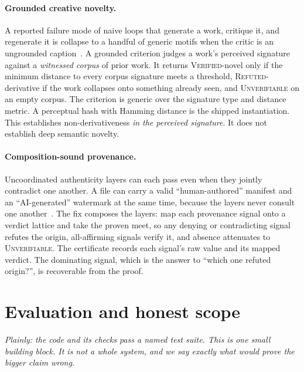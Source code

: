 \documentclass[11pt]{article}
\begin{document}
\paragraph{Grounded creative novelty.} A reported failure mode of naive loops that generate a work, critique it, and regenerate it is collapse to a handful of generic motifs when the critic is an ungrounded caption~\cite{patterns}. A grounded criterion judges a work's perceived signature against a \emph{witnessed corpus} of prior work. It returns \textsc{Verified}-novel only if the minimum distance to every corpus signature meets a threshold, \textsc{Refuted}-derivative if the work collapses onto something already seen, and \textsc{Unverifiable} on an empty corpus. The criterion is generic over the signature type and distance metric. A perceptual hash with Hamming distance is the shipped instantiation. This establishes non-derivativeness \emph{in the perceived signature}. It does not establish deep semantic novelty.

\paragraph{Composition-sound provenance.} Uncoordinated authenticity layers can each pass even when they jointly contradict one another. A file can carry a valid ``human-authored'' manifest and an ``AI-generated'' watermark at the same time, because the layers never consult one another~\cite{authcontra}. The fix composes the layers: map each provenance signal onto a verdict lattice and take the proven meet, so any denying or contradicting signal refutes the origin, all-affirming signals verify it, and absence attenuates to \textsc{Unverifiable}. The certificate records each signal's raw value and its mapped verdict. The dominating signal, which is the answer to ``which one refuted origin?'', is recoverable from the proof.

\section{Evaluation and honest scope}\label{sec:scope}
\emph{Plainly: the code and its checks pass a named test suite. This is one small building block. It is not a whole system, and we say exactly what would prove the bigger claim wrong.}
\end{document}
